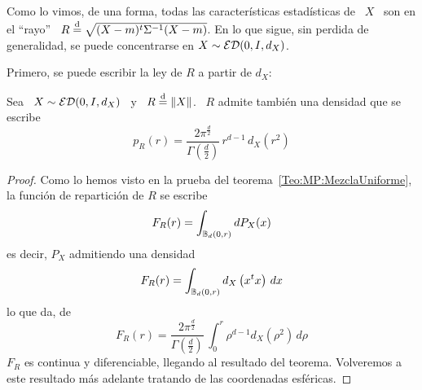Como lo vimos, de una forma, todas las caracter\'isticas estad\'isticas de \ $X$
\ son  en el ``rayo''  \ $R \stackrel{\mathrm{d}}{=}  \sqrt{(X-m)^t \Sigma^{-1} (X-m)}$. En  lo que
sigue,  sin   perdida  de  generalidad,   se  puede  concentrarse  en   $X  \sim
\mathcal{ED}(0,I,d_X)$.

Primero, se puede escribir la ley de $R$ a partir de $d_X$:
%
\begin{teorema}
\label{Teo:MP:DensidadRayo}
%
  Sea \ $X \sim \mathcal{ED}(0,I,d_X)$ \ y \ $R \stackrel{\mathrm{d}}{=} \|X\|$. \ $R$ admite tambi\'en una
  densidad que se escribe
  \[
  p_R(r)  =  \frac{2  \pi^{\frac{d}{2}}}{\Gamma\left(  \frac{d}{2}  \right)}  \,
  r^{d-1} \, d_X\left( r^2 \right)
  \]
\end{teorema}
%
\begin{proof}
  Como lo  hemos visto en la prueba  del teorema~\ref{Teo:MP:MezclaUniforme}, la
  funci\'on de repartici\'on de $R$ se escribe
  \[
  F_R(r) = \int_{\mathbb{B}_d(0,r)} dP_X(x)
  \]
  es decir, $P_X$ admitiendo una densidad
  \[
  F_R(r) = \int_{\mathbb{B}_d(0,r)} d_X\left( x^t x \right) \, dx
  \]
  lo que da, de~\cite[Ec.~4.642]{GraRyz15}
  \[
  F_R(r)  =  \frac{2  \pi^{\frac{d}{2}}}{\Gamma\left(  \frac{d}{2}  \right)}  \,
  \int_0^r \rho^{d-1} d_X\left( \rho^2 \right) \, d\rho
  \]
  $F_R$   es    continua   y   diferenciable,   llegando    al   resultado   del
  teorema.  Volveremos   a  este  resultado  m\'as  adelante   tratando  de  las
  coordenadas esf\'ericas.
\end{proof}

